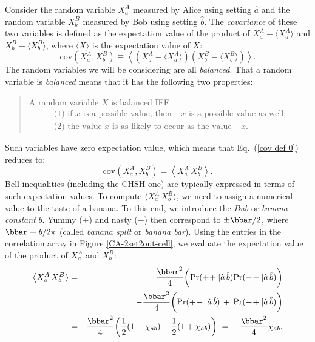 Consider the random variable $X_a^A$ measured by Alice using setting $\hat{a}$ and the random variable $X_b^B$ measured by Bob using setting $\hat{b}$. The  \emph{covariance} of these two variables is defined as the expectation value of the product of $X_a^A - \langle X_a^A \rangle$ and $X_b^B - \langle X_b^B \rangle$, where $\langle X \rangle$ is the expectation value of $X$:
\begin{equation}
\mathrm{cov} \! \left( X_a^A, X_b^B \right) \equiv \left\langle \left( X_a^A - \langle X_a^A \rangle \right) \left( X_b^B - \langle X_b^B \rangle \right) \right\rangle.
\label{cov def 0}
\end{equation}
The random variables we will be considering are all \emph{balanced}. That a random variable is \emph{balanced} means that it has the following two properties:
\begin{quote}
A random variable $X$ is balanced IFF
\begin{equation}
\begin{array}{l}
\text{(1) if $x$ is a possible value, then $-x$ is a possible value as well;} \\[.2cm]
\text{(2) the value $x$ is as likely to occur as the value $-x$.} 
\end{array}
\label{def balanced}
\end{equation}
\end{quote}
Such variables have zero expectation value, which means that Eq.\ (\ref{cov def 0}) reduces to:
\begin{equation}
\mathrm{cov} \! \left( X_a^A, X_b^B \right) = \left\langle  X_a^A \, X_b^B \right\rangle.
\label{cov def}
\end{equation}
Bell inequalities (including the CHSH one) are typically expressed in terms of such expectation values. To compute $\langle  X_a^A \, X_b^B \rangle$, we need to assign a numerical value to the taste of a banana. To this end, we introduce the \emph{Bub} or \emph{banana constant} $b$. Yummy ($+$) and nasty ($-$) then correspond to $\pm \bbar/2$, where $\bbar \equiv b/2\pi$ (called \emph{banana split} or \emph{banana bar}). Using the entries in the correlation array in Figure \ref{CA-2set2out-cell}, we evaluate the expectation value of the product of $X_a^A$ and $X_b^B$:
\begin{eqnarray}
\bigl\langle X_a^A \, X_b^B \bigr\rangle & = & \frac{\bbar^2}{4} \biggl(\mathrm{Pr}(+\!+| \hat{a} \,\hat{b})
 \mathrm{Pr}(-\!-| \hat{a} \,\hat{b})\biggr) \nonumber\\
&& - \frac{\bbar^2}{4} \biggl(\mathrm{Pr}(+\!-| \hat{a} \,\hat{b}) \, + \, \mathrm{Pr}(-\!+| \hat{a} \,\hat{b})\biggr) \nonumber \\
& =  &\frac{\bbar^2}{4} \biggl( \frac12 (1 - \chi_{ab}) - \frac12 (1 + \chi_{ab}) \biggr) \; = \; -\frac{\bbar^2}{4} \chi_{ab}.
\label{prob 2 exp}
\end{eqnarray}
